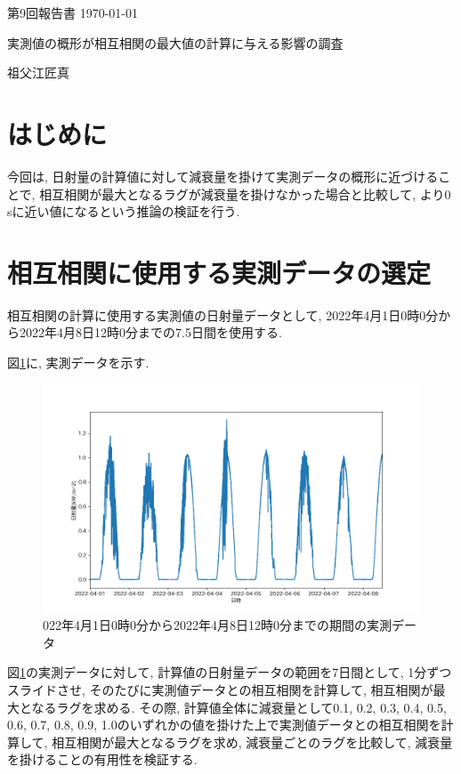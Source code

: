 \documentclass[a4j,12pt,]{jarticle}
\begin{document}
{\noindent\small 第9回報告書 \hfill\today}
\begin{center}
  {\Large 実測値の概形が相互相関の最大値の計算に与える影響の調査}
\end{center}
\begin{flushright}
  祖父江匠真 \\
\end{flushright}

\section{はじめに}
今回は, 日射量の計算値に対して減衰量を掛けて実測データの概形に近づけることで, 相互相関が最大となるラグが減衰量を掛けなかった場合と比較して, より0 \si{\second}に近い値になるという推論の検証を行う.

\section{相互相関に使用する実測データの選定}
相互相関の計算に使用する実測値の日射量データとして, 2022年4月1日0時0分から2022年4月8日12時0分までの7.5日間を使用する.

図\ref{p1}に, 実測データを示す.

\begin{figure}[H]
  \begin{center}
    \includegraphics[width=160mm]{1.png}
    \caption{022年4月1日0時0分から2022年4月8日12時0分までの期間の実測データ}
    \label{p1}
  \end{center}
\end{figure}

図\ref{p1}の実測データに対して, 計算値の日射量データの範囲を7日間として, 1分ずつスライドさせ, そのたびに実測値データとの相互相関を計算して, 相互相関が最大となるラグを求める.
その際, 計算値全体に減衰量として0.1, 0.2, 0.3, 0.4, 0.5, 0.6, 0.7, 0.8, 0.9, 1.0のいずれかの値を掛けた上で実測値データとの相互相関を計算して, 相互相関が最大となるラグを求め, 減衰量ごとのラグを比較して, 減衰量を掛けることの有用性を検証する.
\end{document}
